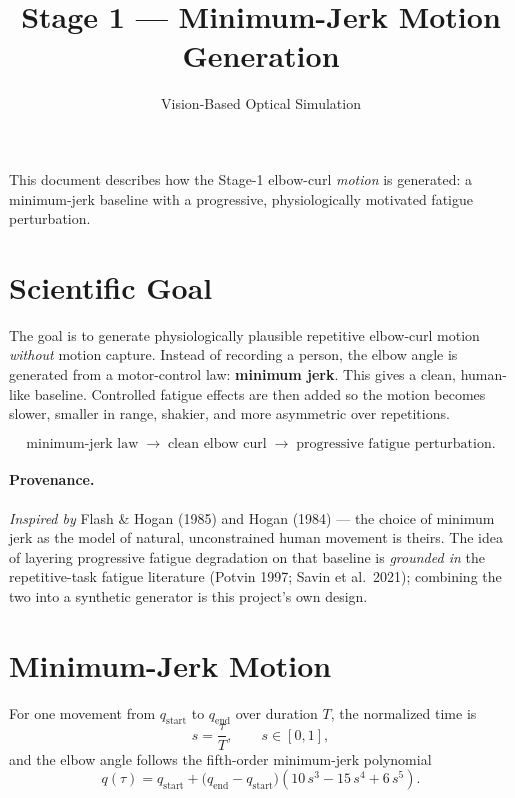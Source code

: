 \documentclass[11pt]{article}
\title{Stage 1 --- Minimum-Jerk Motion Generation}
\author{Vision-Based Optical Simulation}
\date{}
\begin{document}
\maketitle

\noindent
This document describes how the Stage-1 elbow-curl \emph{motion} is generated:
a minimum-jerk baseline with a progressive, physiologically motivated fatigue
perturbation.

\section{Scientific Goal}

The goal is to generate physiologically plausible repetitive elbow-curl motion
\emph{without} motion capture. Instead of recording a person, the elbow angle is
generated from a motor-control law: \textbf{minimum jerk}. This gives a clean,
human-like baseline. Controlled fatigue effects are then added so the motion
becomes slower, smaller in range, shakier, and more asymmetric over repetitions.

\[
\text{minimum-jerk law} \;\rightarrow\; \text{clean elbow curl}
\;\rightarrow\; \text{progressive fatigue perturbation}.
\]

\paragraph{Provenance.} \textit{Inspired by} Flash \& Hogan (1985) and Hogan
(1984) --- the choice of minimum jerk as the model of natural, unconstrained
human movement is theirs. The idea of layering progressive fatigue degradation
on that baseline is \textit{grounded in} the repetitive-task fatigue literature
(Potvin 1997; Savin et al.\ 2021); combining the two into a synthetic generator
is this project's own design.

\section{Minimum-Jerk Motion}

For one movement from $q_{\text{start}}$ to $q_{\text{end}}$ over duration $T$,
the normalized time is
\[
s = \frac{\tau}{T}, \qquad s \in [0,1],
\]
and the elbow angle follows the fifth-order minimum-jerk polynomial
\begin{equation}
q(\tau) = q_{\text{start}} + \bigl(q_{\text{end}} - q_{\text{start}}\bigr)
\left( 10\,s^{3} - 15\,s^{4} + 6\,s^{5} \right).
\end{equation}
\end{document}
